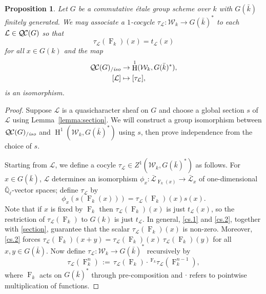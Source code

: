 \documentclass[11pt]{amsart}
\theoremstyle{plain}
\newtheorem{proposition}[theorem]{Proposition}
\theoremstyle{definition}
\theoremstyle{remark}
\newcommand{\EE}{\mathbb{\bar Q}_\ell}
\newcommand{\bFq}{\bar{k}}
\newcommand{\Fq}{k}
\newcommand{\Frob}[1]{\operatorname{F}_{#1}}
\DeclareMathOperator{\Hh}{H}
\newcommand{\ceq}{{\, :=\, }}
\newcommand{\qcs}[1]{{\mathcal{#1}}}
\newcommand{\gqcs}[1]{{\mathcal{\bar #1}}}
\newcommand{\QC}{{\mathcal{Q\hskip-0.8pt C}}}
\newcommand{\QCiso}[1]{\QC(#1)_{/\textit{iso}}}
\newcommand{\Weil}[1]{\mathcal{W}_{#1}}
\newcommand{\trFrob}[1]{t_{#1}}
\newcommand\Clifton[1]{\marginpar{\smaller\smaller CC: #1}}
\begin{document}
\begin{proposition}\label{prop:etale}
  Let $G$ be a commutative \'etale group scheme over $\Fq$ with $G(\bFq)$ finitely generated.
  \Clifton{Use: Etale $\QC$-schemes?}
  We may associate a $1$-cocycle $\tau_\qcs{L}: \Weil{\Fq}\to G(\bFq)^*$ to each $\qcs{L} \in \QC(G)$
  so that
  \[
  \tau_\qcs{L}(\Frob{\Fq})(x) = \trFrob{\qcs{L}}(x)
  \]
  for all $x \in G(\Fq)$ and the map
  \begin{align*}
  \QCiso{G} &\to \Hh^1(\Weil{\Fq}, G(\bFq)^*), \\
  [\qcs{L}] &\mapsto [\tau_\qcs{L}],
  \end{align*}
  is an isomorphism.
\end{proposition}

\begin{proof}
  Suppose $\qcs{L}$ is a quasicharacter sheaf on $G$ and choose a global section $s$
  of $\qcs{L}$ using Lemma~\ref{lemma:section}.
  We will construct a group isomorphism between $\QCiso{G}$ and
  $\Hh^1(\Weil{\Fq}, G(\bFq)^*)$ using $s$, then prove independence from the choice of $s$.

  Starting from $\qcs{L}$, we define a cocyle $\tau_{\qcs{L}} \in Z^1(\Weil{\Fq},G(\bFq)^*)$ as follows.
  For $x \in G(\bFq)$, $\qcs{L}$ determines an isomorphism $\phi_x : \gqcs{L}_{\Frob{\Fq}(x)} \to \gqcs{L}_x$
  of one-dimensional $\EE$-vector spaces; define $\tau_\qcs{L}$ by
  \begin{equation}\label{t}
   \phi_{x}(s(\Frob{\Fq}(x))) = \tau_\qcs{L}(\Frob{\Fq})(x) s(x).
  \end{equation}
  Note that if $x$ is fixed by $\Frob{k}$ then $\tau_\qcs{L}(\Frob{\Fq})(x)$ is just $\trFrob{\qcs{L}}(x)$, so the restriction of
  $\tau_\qcs{L}(\Frob{k})$ to $G(k)$ is just $\trFrob{\qcs{L}}$.
  In general, \ref{cs.1} and \ref{cs.2}, together with \eqref{section}, guarantee that
  the scalar $\tau_\qcs{L}(\Frob{k})(x)$ is non-zero.  
  Moreover, \ref{cs.2} forces
  $\tau_\qcs{L}(\Frob{\Fq})(x+y) = \tau_\qcs{L}(\Frob{\Fq})(x) \ \tau_\qcs{L}(\Frob{\Fq})(y)$
  for all $x,y \in G(\bFq)$.  Now define $\tau_\qcs{L} : \Weil{\Fq} \to G(\bFq)^*$ recursively by
  \[
   \tau_\qcs{L}(\Frob{\Fq}^n) \ceq \tau_\qcs{L}(\Frob{\Fq})\cdot \,^{\Frob{\Fq}} \tau_\qcs{L}(\Frob{\Fq}^{n-1}),
  \]
  where $\Frob{\Fq}$ acts on $G(\bFq)^*$ through pre-composition and $\cdot$ refers
  to pointwise multiplication of functions.


\end{proof}
\end{document}

